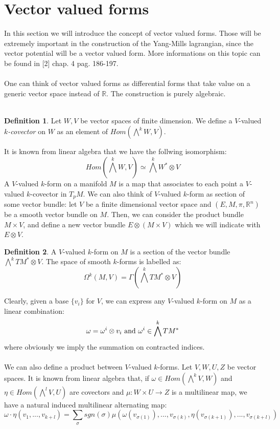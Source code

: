 \documentclass[12pt,a4paper]{report}
\theoremstyle{definition}
\newtheorem{Def}{Definition}[chapter]
\theoremstyle{Theorem}
\theoremstyle{definition}
\theoremstyle{definition}
\begin{document}
	\section{Vector valued forms}
	In this section we will introduce the concept of vector valued forms. Those will be extremely important in the construction of the Yang-Mills lagrangian, since the vector potential will be a vector valued form. More informations on this topic can be found in [2] chap. 4 pag. 186-197.
	\\\\
	One can think of vector valued forms as differential forms that take value on a generic vector space instead of $\mathbb{R}$. The construction is purely algebraic.\\
	\\
	\begin{Def}
		Let $W,V$ be vector spaces of finite dimension. We define a $V$-valued \textit{$k$-covector} on $W$ as an element of $Hom(\bigwedge^k W,V)$.
	\end{Def}
	It is known from linear algebra that we have the follwing isomorphism:
	$$Hom(\bigwedge^k W,V)\simeq \bigwedge^k W^*\otimes V$$
	A $V$-valued $k$-form on a manifold $M$ is a map that associates to each point a $V$-valued $k$-covector in $T_pM$. We can also think of $V$-valued $k$-form as section of some vector bundle: let $V$ be a finite dimensional vector space and $(E,M,\pi,\mathbb{R}^n)$ be a smooth vector bundle on $M$. Then, we can consider the product bundle $M\times V$, and define a new vector bundle $E\otimes (M\times V)$ which we will indicate with $E\otimes V$.
	\begin{Def}
		A $V$-valued $k$-form on $M$ is a section of the vector bundle $\bigwedge^k TM^*\otimes V$. The space of smooth $k$-forms is labelled as:
		$$\Omega^k(M,V)=\Gamma(\bigwedge^k TM^*\otimes V)$$
	\end{Def}
	Clearly, given a base $\{v_i\}$ for $V$, we can express any $V$-valued $k$-form on $M$ as a linear combination:
	$$\omega=\omega^i\otimes v_i \hbox{ and } \omega^i\in \bigwedge^k TM^*$$
	where obviously we imply the summation on contracted indices. \\
	\\
	We can also define a product between $V$-valued $k$-forms. Let $V,W,U,Z$ be vector spaces. It is known from linear algebra that, if $\omega\in Hom(\bigwedge^kV,W)$ and $\eta\in Hom(\bigwedge^lV,U)$ are covectors and $\mu:W\times U\rightarrow Z$ is a multilinear map, we have a natural induced multilinear alternating map:
	$$\omega\cdot \eta(v_1,...,v_{k+l})=\sum_\sigma sgn(\sigma)\mu(\omega(v_{\sigma(1)}),...,v_{\sigma(k)},\eta(v_{\sigma(k+1)}),...,v_{\sigma(k+l)})$$
\end{document}
